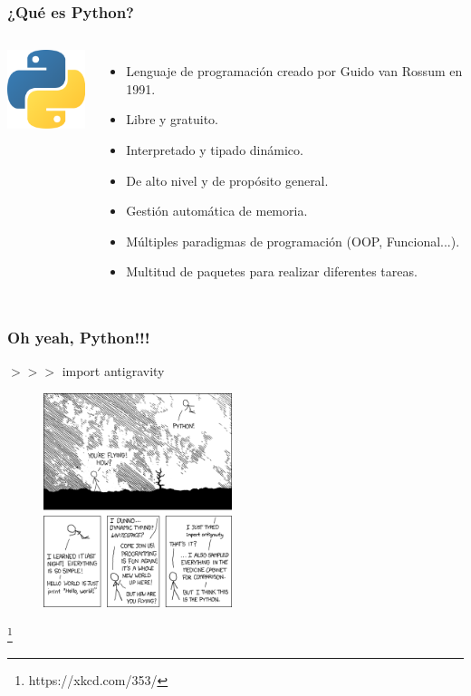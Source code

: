 \documentclass[18pt]{beamer}
\newcommand\blfootnote[1]{%
  \begingroup
  \renewcommand\thefootnote{}\footnote{#1}%
  \addtocounter{footnote}{-1}%
  \endgroup
}
\begin{document}
\begin{frame}

	\frametitle{¿Qué es Python?}
	\begin{columns}
		\centering
			\includegraphics[width=2.5cm]{images/python_logo_cuadrado.png}
			
		\begin{itemize}
			\setlength\itemsep{0.6em}		
			\item Lenguaje de programación creado por Guido van Rossum en 1991.
			\item Libre y gratuito.
			\item Interpretado y tipado dinámico.
			\item De alto nivel y de propósito general.
			\item Gestión automática de memoria.
			\item Múltiples paradigmas de programación (OOP, Funcional...).
			\item Multitud de paquetes para realizar diferentes tareas.
		\end{itemize}
	\end{columns}
	
\end{frame}


\begin{frame}

	\frametitle{Oh yeah, Python!!!}
	
	$>>>$ import antigravity
    
	\begin{figure}
		\includegraphics[width=5.5cm]{images/xkcd.png}
	\end{figure}
	
	\blfootnote{\scriptsize https://xkcd.com/353/}
	
	
\end{frame}
\end{document}
